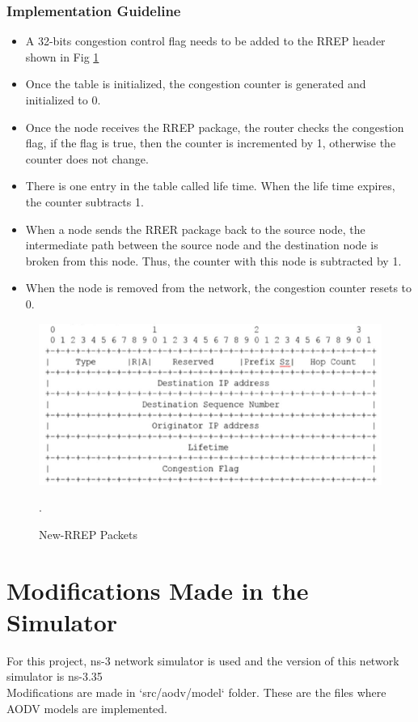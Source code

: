 \documentclass[12pt, a4paper]{article}
\begin{document}
\subsubsection{Implementation Guideline}
\begin{itemize}
    \item A 32-bits congestion control flag needs to be added to the RREP header shown in Fig \ref{fig:rrep-header}
    \item Once the table is initialized, the congestion counter is
generated and initialized to 0.
    \item Once the node receives the RREP package, the router
checks the congestion flag, if the flag is true, then the counter
is incremented by 1, otherwise the counter does not change.
    \item There is one entry in the table called life time. When the life time expires, the counter subtracts 1.
    \item When a node sends the RRER package back to the source node, the intermediate path between the source node and the destination node is broken from this node. Thus, the counter with this node is subtracted by 1.
    \item When the node is removed from the network, the congestion
counter resets to 0.
\end{itemize}
\begin{figure}[H]
\centering
\includegraphics[scale = 0.6]{images/cc-aodv/rrep-header.png}
\caption{New-RREP Packets}.
\label{fig:rrep-header}
\end{figure}

\section{Modifications Made in the Simulator}
For this project, ns-3 network simulator is used and the version of this network simulator is ns-3.35\\
Modifications are made in `src/aodv/model` folder. These are the files where AODV models are implemented.
\end{document}
